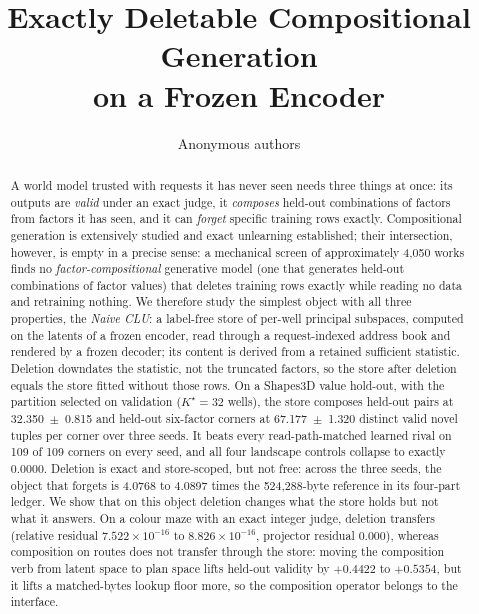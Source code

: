 \documentclass{article} %
\title{Exactly Deletable Compositional Generation\\ on a Frozen Encoder}
\author{Anonymous authors}
\newcommand{\sci}[2]{\ensuremath{#1\times10^{#2}}}
\newcommand{\Kstar}{\ensuremath{K^{\star}}}
\begin{document}
\maketitle

\begin{abstract}
A world model trusted with requests it has never seen needs three things at once: its outputs are \emph{valid} under an exact judge, it \emph{composes}
held-out combinations of factors from factors it has seen, and it can \emph{forget} specific
training rows exactly. Compositional generation is extensively studied and exact unlearning established; their intersection, however, is empty in a precise sense: a mechanical
screen of approximately 4,050 works finds no \emph{factor-compositional} generative model (one that generates held-out combinations of factor values) that deletes training rows
exactly while reading no data and retraining nothing. %
We therefore study the simplest object with all three properties, the \emph{Naive CLU}: a
label-free store of per-well principal subspaces, computed on the latents of a frozen
encoder, read through a request-indexed address book and rendered by a frozen decoder; its
content is derived from a retained sufficient statistic. Deletion downdates the statistic, not the truncated factors, so the store after deletion equals the store fitted without those rows.
On a Shapes3D value hold-out, with the partition selected on validation ($\Kstar=32$ wells),
the store composes held-out pairs at 32.350~$\pm$~0.815 and held-out six-factor corners at
67.177~$\pm$~1.320 distinct valid novel tuples per corner over three seeds. It beats every
read-path-matched learned rival on 109 of 109 corners on every seed, and all four landscape
controls collapse to exactly 0.0000. %
Deletion is exact and store-scoped, but not free: across the three seeds, the object
that forgets is 4.0768 to 4.0897 times the 524,288-byte reference in its four-part ledger. We show that on this object deletion changes what the store holds but not what it answers.
On a colour maze with an exact integer judge, deletion transfers
(relative residual \sci{7.522}{-16} to \sci{8.826}{-16}, projector residual 0.000), %
whereas composition on routes does not transfer through the store: moving the composition verb from
latent space to plan space lifts held-out validity by $+0.4422$ to $+0.5354$, but it lifts a matched-bytes lookup floor more, so the composition operator belongs to the interface.

\end{abstract}
\end{document}

